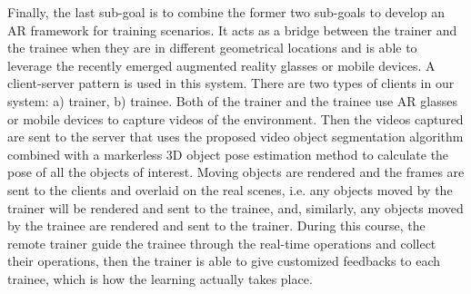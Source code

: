 Finally, the last sub-goal is to combine the former two sub-goals to develop an AR framework for training scenarios.
It acts as a bridge between the trainer and the trainee when they are in different geometrical locations and is able to leverage the recently emerged augmented reality glasses or mobile devices.
A client-server pattern is used in this system. There are two types of clients in our system: a) trainer, b) trainee.
Both of the trainer and the trainee use AR glasses or mobile devices to capture videos of the environment.
Then the videos captured are sent to the server that uses the proposed video object segmentation algorithm combined with a markerless 3D object pose estimation method to calculate the pose of all the objects of interest.
Moving objects are rendered and the frames are sent to the clients and overlaid on the real scenes, i.e. any objects moved by the trainer will be rendered and sent to the trainee, and, similarly, any objects moved by the trainee are rendered and sent to the trainer.
During this course, the remote trainer guide the trainee through the real-time operations and collect their operations, then the trainer is able to give customized feedbacks to each trainee, which is how the learning actually takes place.

\cleardoublepage
